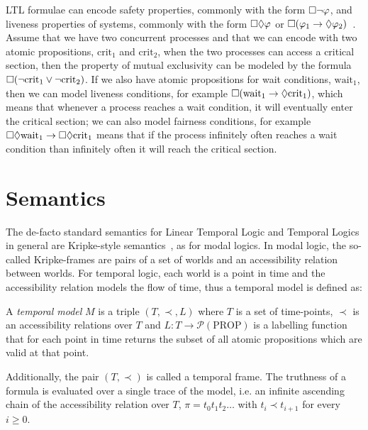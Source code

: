 LTL formulae can encode safety properties, commonly with the form $\Box{\neg\varphi}$, and liveness properties of
systems, commonly with the form $\Box{\Diamond{\varphi}}$ or $\Box{(\varphi_1 \to
\Diamond{\varphi_2})}$~\cite{baier_principles_2008}. Assume that we have two concurrent processes and that we can
encode with two atomic propositions, $\text{crit}_1$ and $\text{crit}_2$, when the two processes can access a critical
section, then the property of mutual exclusivity can be modeled by the formula $\Box{(\neg\text{crit}_1 \lor
\neg\text{crit}_2)}$. If we also have atomic propositions for wait conditions, $\text{wait}_1$, then we can model
liveness conditions, for example $\Box{(\text{wait}_1 \to \Diamond{\text{crit}_1})}$, which means that whenever a
process reaches a wait condition, it will eventually enter the critical section; we can also model fairness conditions, for
example $\Box{\Diamond{\text{wait}_1}} \to \Box{\Diamond{\text{crit}_1}}$ means that if the process
infinitely often reaches a wait condition than infinitely often it will reach the critical section.

\section{Semantics}

The de-facto standard semantics for Linear Temporal Logic and Temporal Logics in general are Kripke-style
semantics~\cite{gasquet_kripkes_2011}, as for modal logics. In modal logic, the so-called Kripke-frames are pairs of a set
of worlds and an accessibility relation between worlds. For temporal logic, each world is a point in time and the
accessibility relation models the flow of time, thus a temporal model is defined as:

\begin{definition}
  A \emph{temporal model} $M$ is a triple $(T, \prec, L)$ where $T$ is a set of time-points, $\prec$ is an accessibility
  relations over $T$ and $L : T \to \mathcal{P}(\text{PROP})$ is a labelling function that for each point in time
  returns the subset of all atomic propositions which are valid at that point.
\end{definition}

Additionally, the pair $(T, \prec)$ is called a temporal frame. The truthness of a formula is evaluated over a single
trace of the model, i.e. an infinite ascending chain of the accessibility relation over $T$,
$\pi = t_0t_1t_2\ldots$ with $t_i \prec t_{i+1}$ for every $i \geq 0$.

